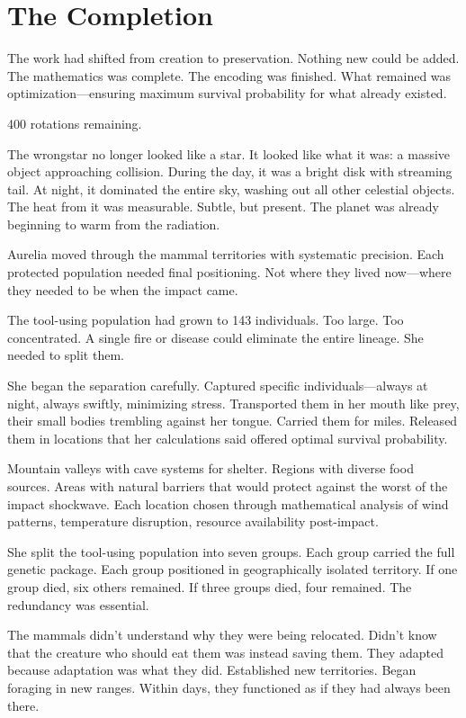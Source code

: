 \chapter{The Completion}
\label{ch:11}


The work had shifted from creation to preservation. Nothing new could be added. The mathematics was complete. The encoding was finished. What remained was optimization—ensuring maximum survival probability for what already existed.

400 rotations remaining.

The wrongstar no longer looked like a star. It looked like what it was: a massive object approaching collision. During the day, it was a bright disk with streaming tail. At night, it dominated the entire sky, washing out all other celestial objects. The heat from it was measurable. Subtle, but present. The planet was already beginning to warm from the radiation.

Aurelia moved through the mammal territories with systematic precision. Each protected population needed final positioning. Not where they lived now—where they needed to be when the impact came.

\scenebreak

The tool-using population had grown to 143 individuals. Too large. Too concentrated. A single fire or disease could eliminate the entire lineage. She needed to split them.

She began the separation carefully. Captured specific individuals—always at night, always swiftly, minimizing stress. Transported them in her mouth like prey, their small bodies trembling against her tongue. Carried them for miles. Released them in locations that her calculations said offered optimal survival probability.

Mountain valleys with cave systems for shelter. Regions with diverse food sources. Areas with natural barriers that would protect against the worst of the impact shockwave. Each location chosen through mathematical analysis of wind patterns, temperature disruption, resource availability post-impact.

She split the tool-using population into seven groups. Each group carried the full genetic package. Each group positioned in geographically isolated territory. If one group died, six others remained. If three groups died, four remained. The redundancy was essential.

The mammals didn't understand why they were being relocated. Didn't know that the creature who should eat them was instead saving them. They adapted because adaptation was what they did. Established new territories. Began foraging in new ranges. Within days, they functioned as if they had always been there.

